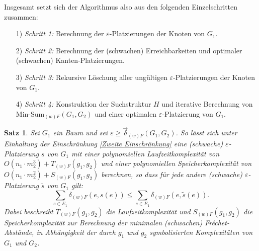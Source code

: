 \documentclass[a4paper, 12pt, twoside]{article}
\theoremstyle{Format1} %
\newtheorem{Satz}[Def]{Satz}                %
\begin{document}
Insgesamt setzt sich der Algorithmus also aus den folgenden Einzelschritten zusammen:
\begin{enumerate}
	\item[1)] \textit{Schritt 1:} Berechnung der $\varepsilon$-Platzierungen der Knoten von $G_1$.
	\item[2)] \textit{Schritt 2:} Berechnung der (schwachen) Erreichbarkeiten und optimaler (schwachen) Kanten-Platzierungen.
	\item[3)] \textit{Schritt 3:} Rekursive Löschung aller ungültigen $\varepsilon$-Platzierungen der Knoten von $G_1$.
	\item[4)] \textit{Schritt 4:} Konstruktion der Suchstruktur $H$ und iterative Berechnung von Min-Sum$_{(w)F}(G_1, G_2)$ und einer optimalen $\varepsilon$-Platzierung von $G_1$.
\end{enumerate}

\begin{Satz}
	Sei $G_1$ ein Baum und sei $\varepsilon \geq \vec{\delta}_{(w)F}(G_1,G_2)$.
	So lässt sich unter Einhaltung der Einschränkung \ref{Zweite Einschränkung} eine (schwache) $\varepsilon$-Platzierung $s$ von $G_1$
	mit einer polynomiellen Laufzeitkomplexität von $O(n_1 \cdot m_2^3) + T_{(w)F}(g_1, g_2)$ und einer polynomiellen Speicherkomplexität von $O(n_1 \cdot m_2^2) + S_{(w)F}(g_1, g_2)$ berechnen, so dass für jede
	andere (schwache) $\varepsilon$-Platzierung $\tilde{s}$ von $G_1$ gilt:
	$$\sum_{e \in E_1}\delta_{(w)F}(e, s(e)) \leq \sum_{e \in E_1}\delta_{(w)F}(e, \tilde{s}(e)).$$
	Dabei beschreibt $T_{(w)F}(g_1, g_2)$ die Laufzeitkomplexität und $S_{(w)F}(g_1, g_2)$ die Speicherkomplexität zur Berechnung der minimalen (schwachen) Fréchet-Abstände, in Abhängigkeit
	der durch $g_1$ und $g_2$ symbolisierten Komplexitäten von $G_1$ und $G_2$.
\end{Satz}
\end{document}
